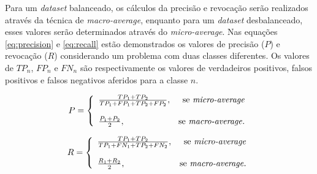 Para um \emph{dataset} balanceado, os cálculos da precisão e revocação serão realizados através da técnica de \emph{macro-average}, enquanto para um \emph{dataset} desbalanceado, esses valores serão determinados através do \emph{micro-average}. Nas equações \ref{eq:precision} e \ref{eq:recall} estão demonstrados os valores de precisão ($P$) e revocação ($R$) considerando um problema com duas classes diferentes. Os valores de $TP_n$, $FP_n$ e $FN_n$ são respectivamente os valores de verdadeiros positivos, falsos positivos e falsos negativos aferidos para a classe $n$.

\begin{equation}
\label{eq:precision}
P = \left\{
\begin{array}{lr}
  \frac{TP_1 + TP_2}{TP_1 + FP_1 + TP_2 + FP_2}, & \text{se \emph{micro-average}}\\
  \\
  \frac{P_1 + P_2}{2}, & \text{se \emph{macro-average}}.
\end{array}
\right.
\end{equation}

\begin{equation}
\label{eq:recall}
R = \left\{
\begin{array}{lr}
  \frac{TP_1 + TP_2}{TP_1 + FN_1 + TP_2 + FN_2}, & \text{se \emph{micro-average}}\\
  \\
  \frac{R_1 + R_2}{2}, & \text{se \emph{macro-average}}.
\end{array}
\right.
\end{equation}
